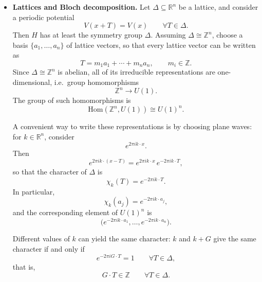 {\begin{itemize}
        \item \textbf{Lattices and Bloch decomposition.} Let
        \(\Delta \subseteq \mathbb{R}^n\) be a lattice, and consider a
        periodic potential
        \[
            V(x + T) = V(x)
            \qquad
            \forall T \in \Delta.
        \]
        Then \(H\) has at least the symmetry group \(\Delta\). Assuming
        \(\Delta \cong \mathbb{Z}^n\), choose a basis
        \(\{a_1, \dots, a_n\}\) of lattice vectors, so that every lattice
        vector can be written as
        \[
            T = m_1 a_1 + \cdots + m_n a_n,
            \qquad
            m_i \in \mathbb{Z}.
        \]
        Since \(\Delta \cong \mathbb{Z}^n\) is abelian, all of its irreducible
        representations are one-dimensional, i.e.\ group homomorphisms
        \[
            \mathbb{Z}^n \to U(1).
        \]
        The group of such homomorphisms is
        \[
            \mathrm{Hom}(\mathbb{Z}^n, U(1)) \cong {U(1)}^n.
        \]

        A convenient way to write these representations is by choosing plane
        waves: for \(k \in \mathbb{R}^n\), consider
        \[
            e^{2\pi i k \cdot x}.
        \]
        Then
        \[
            e^{2\pi i k \cdot (x - T)}
            =
            e^{2\pi i k \cdot x}\, e^{-2\pi i k \cdot T},
        \]
        so that the character of \(\Delta\) is
        \[
            \chi_k(T) = e^{-2\pi i k \cdot T}.
        \]
        In particular,
        \[
            \chi_k(a_j) = e^{-2\pi i k \cdot a_j},
        \]
        and the corresponding element of \({U(1)}^n\) is
        \[
            \bigl(e^{-2\pi i k \cdot a_1}, \dots,
            e^{-2\pi i k \cdot a_n}\bigr).
        \]

        Different values of \(k\) can yield the same character: \(k\) and
        \(k + G\) give the same character if and only if
        \[
            e^{-2\pi i G \cdot T} = 1
            \qquad
            \forall T \in \Delta,
        \]
        that is,
        \[
            G \cdot T \in \mathbb{Z}
            \qquad
            \forall T \in \Delta.
        \]



\end{itemize}}

